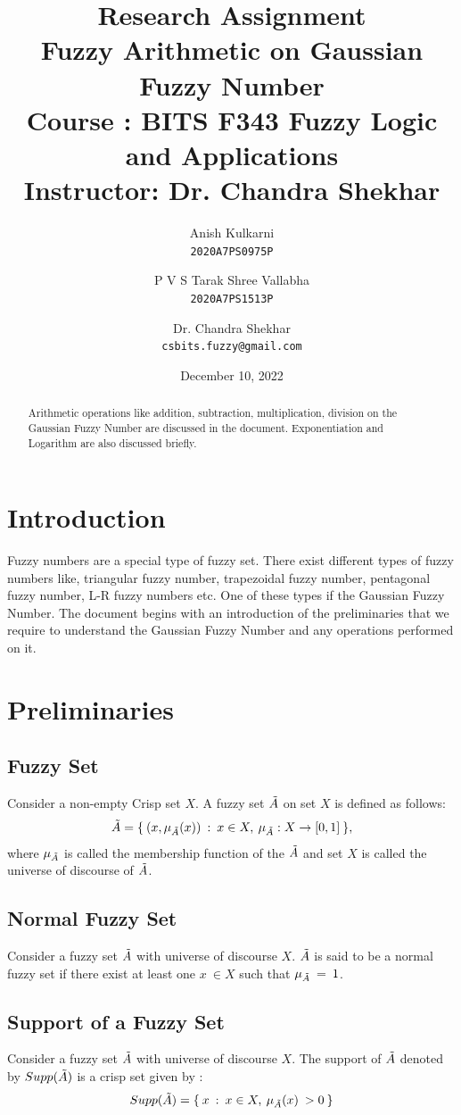 \documentclass{article}
\title{%
Research Assignment\\
\vspace{0.5cm}
  \textbf{Fuzzy Arithmetic on Gaussian Fuzzy Number}\\
  \large 
  \vspace{0.8cm}
  Course : BITS F343 Fuzzy Logic and Applications\\
  \vspace{0.1cm}
  Instructor: Dr. Chandra Shekhar 
  \vspace{0.5cm}
  }
\author{
  Anish Kulkarni\\
  \texttt{2020A7PS0975P}
  \and
  P V S Tarak Shree Vallabha\\
  \texttt{2020A7PS1513P}
  \and
  Dr. Chandra Shekhar\\
  \texttt{csbits.fuzzy@gmail.com}
\vspace{0.6cm}
}
\date{December 10, 2022}
\begin{document}
\maketitle

\begin{abstract}
Arithmetic operations like addition, subtraction, multiplication, division on the Gaussian Fuzzy Number are discussed in the document. Exponentiation and Logarithm are also discussed briefly.
\end{abstract}

\section{Introduction}
Fuzzy numbers are a special type of fuzzy set. There exist different types of fuzzy numbers like, triangular fuzzy number, trapezoidal fuzzy number, pentagonal fuzzy number, L-R fuzzy numbers etc. One of these types if the Gaussian Fuzzy Number. The document begins with an introduction of the preliminaries that we require to understand the Gaussian Fuzzy Number and any operations performed on it.

\section{Preliminaries}

\subsection{Fuzzy Set}

Consider a non-empty Crisp set $X$. A fuzzy set $\Tilde{A}$ on set $X$ is defined as follows:
\begin{equation}
    \Tilde{A} = \{ \: (x, \mu_{\Tilde{A}}(x)) \: : \: x\in{X}, \: \mu_{\Tilde{A}} : X\to{[0,1]} \: \}, 
\end{equation}
where $\mu_{\Tilde{A}}$ is called the membership function of the $\Tilde{A}$  and set $X$ is called the universe of discourse of $\Tilde{A}$.

\subsection{Normal Fuzzy Set}

 Consider a fuzzy set $\Tilde{A}$ with universe of discourse $X$. $\Tilde{A}$ is said to be a normal fuzzy set if there exist at least one $x \: \in X $ such that $\mu_{\Tilde{A}}\:=\:1$.

 \subsection{Support of a Fuzzy Set}
Consider a fuzzy set $\Tilde{A}$ with universe of discourse $X$. The support of $\Tilde{A}$ denoted by $Supp(\Tilde{A})$ is a crisp set given by :
\begin{equation}
    Supp(\Tilde{A}) = \{ \: x \: : \: x \in {X} ,\: \mu_{\Tilde{A}}(x) \: > 0 \: \}
\end{equation}
\end{document}
